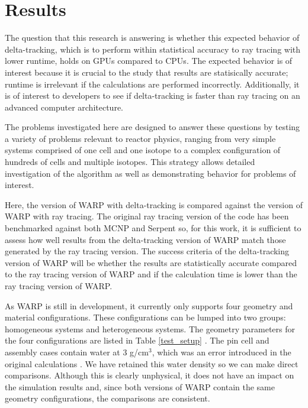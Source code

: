 \chapter{Results}

The question that this research is answering is whether this expected behavior of delta-tracking,
which is to perform within statistical accuracy to ray tracing with lower runtime, holds on GPUs compared 
to CPUs. The expected behavior is of interest because it is crucial to the study that results are 
statisically accurate; runtime is irrelevant if the calculations are performed incorrectly. Additionally, 
it is of interest to developers to see if delta-tracking is faster than ray tracing on an advanced 
computer architecture.

The problems investigated here 
are designed to answer these questions by testing a variety of problems relevant to reactor physics, 
ranging from very simple systems comprised of one cell and one isotope to a complex configuration of
hundreds of cells and multiple isotopes.
This strategy allows detailed investigation of the algorithm as well as demonstrating behavior for 
problems of interest.

Here, the version of WARP with delta-tracking is compared against the version of WARP with ray tracing.
The original ray tracing version of the code has been benchmarked against both MCNP and Serpent 
\cite{warp_thesis} so, for this work, it is sufficient to assess how well results from the delta-tracking 
version of WARP match those generated by the ray tracing version. The success criteria of the 
delta-tracking version of WARP will be whether the results are statistically accurate compared to the ray
tracing version of WARP and if the calculation time is lower than the ray tracing version of WARP.

As WARP is still in development, it currently only supports four geometry and material configurations.
These configurations can be lumped into two groups: homogeneous systems and heterogeneous systems. The 
geometry parameters for the four configurations are listed in Table \ref{test_setup} \cite{warp2015}. The
pin cell and assembly cases contain water at 3 g/cm$^3$, which was an error introduced in the original
calculations \cite{warp_thesis}.
We have retained this water density so we can make direct comparisons. 
 Although this is clearly unphysical, it does not have an impact 
on the simulation results and, since both versions of WARP contain the same geometry configurations, the 
comparisons are consistent.

